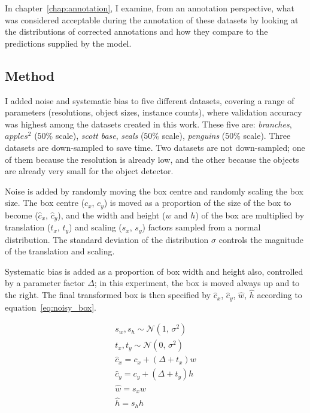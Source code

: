 In chapter~\ref{chap:annotation}, I examine, from an annotation perspective, what was considered acceptable during the annotation of these datasets by looking at the distributions of corrected annotations and how they compare to the predictions supplied by the model. 

\subsection{Method}

I added noise and systematic bias to five different datasets, covering a range of parameters (resolutions, object sizes, instance counts), where validation accuracy was highest among the datasets created in this work. These five are: \emph{branches}, $apples^2$ ($50\%$ scale), \emph{scott base}, \emph{seals} ($50\%$ scale), \emph{penguins} ($50\%$ scale). Three datasets are down-sampled to save time. Two datasets are not down-sampled; one of them because the resolution is already low, and the other because the objects are already very small for the object detector.

Noise is added by randomly moving the box centre and randomly scaling the box size. The box centre ($c_x$, $c_y$) is moved as a proportion of the size of the box to become ($\hat{c}_x$, $\hat{c}_y$), and the width and height ($w$ and $h$) of the box are multiplied by translation ($t_x$, $t_y$) and scaling ($s_x$, $s_y$) factors sampled from a normal distribution. The standard deviation of the distribution $\sigma$ controls the magnitude of the translation and scaling. 

Systematic bias is added as a proportion of box width and height also, controlled by a parameter factor $\Delta$; in this experiment, the box is moved always up and to the right. The final transformed box is then specified by $\hat{c}_x$, $\hat{c}_y$, $\hat{w}$, $\hat{h}$ according to equation~\ref{eq:noisy_box}. 

\begin{equation*}
\begin{split}
    s_w, s_h \sim \mathcal{N}(1,\,\sigma^{2})\\
    t_x, t_y \sim \mathcal{N}(0,\,\sigma^{2})\\
    \hat{c}_x = c_x + (\Delta + t_x) w\\
    \hat{c}_y = c_y + (\Delta + t_y) h\\
    \hat{w} = s_x w\\
    \hat{h} = s_h h\\
\end{split}
\label{eq:noisy_box}
\end{equation*}

